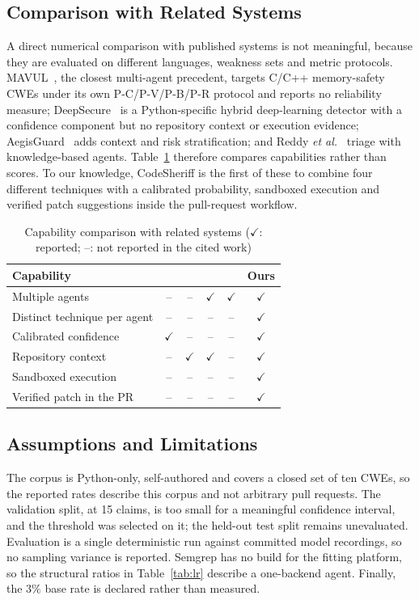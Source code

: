\documentclass[conference]{IEEEtran}
\begin{document}
\subsection{Comparison with Related Systems}
A direct numerical comparison with published systems is not meaningful,
because they are evaluated on different languages, weakness sets and metric
protocols. MAVUL~\cite{ref16}, the closest multi-agent precedent, targets
C/C++ memory-safety CWEs under its own P-C/P-V/P-B/P-R protocol and reports
no reliability measure; DeepSecure~\cite{ref2} is a Python-specific hybrid
deep-learning detector with a confidence component but no repository
context or execution evidence; AegisGuard~\cite{ref1} adds context and risk
stratification; and Reddy \textit{et al.}~\cite{ref6} triage with
knowledge-based agents. Table~\ref{tab:related} therefore compares
capabilities rather than scores. To our knowledge, CodeSheriff is the first
of these to combine four different techniques with a calibrated
probability, sandboxed execution and verified patch suggestions inside the
pull-request workflow.

\begin{table}[t]
\centering
\caption{Capability comparison with related systems
($\checkmark$: reported; --: not reported in the cited work)}
\label{tab:related}
\small
\setlength{\tabcolsep}{3pt}
\begin{tabular}{lccccc}
\toprule
Capability & \cite{ref2} & \cite{ref1} & \cite{ref16} & \cite{ref6} & Ours \\
\midrule
Multiple agents              & --  & --  & $\checkmark$ & $\checkmark$ & $\checkmark$ \\
Distinct technique per agent & --  & --  & --  & --  & $\checkmark$ \\
Calibrated confidence        & $\checkmark$ & --  & --  & --  & $\checkmark$ \\
Repository context           & --  & $\checkmark$ & $\checkmark$ & --  & $\checkmark$ \\
Sandboxed execution          & --  & --  & --  & --  & $\checkmark$ \\
Verified patch in the PR     & --  & --  & --  & --  & $\checkmark$ \\
\bottomrule
\end{tabular}
\end{table}

\subsection{Assumptions and Limitations}
\label{subsec:limitations}
The corpus is Python-only, self-authored and covers a closed set of ten
CWEs, so the reported rates describe this corpus and not arbitrary pull
requests. The validation split, at 15 claims, is too small for a meaningful
confidence interval, and the threshold was selected on it; the held-out
test split remains unevaluated. Evaluation is a single deterministic run
against committed model recordings, so no sampling variance is reported.
Semgrep has no build for the fitting platform, so the structural ratios in
Table~\ref{tab:lr} describe a one-backend agent. Finally, the $3\%$ base
rate is declared rather than measured.
\end{document}
